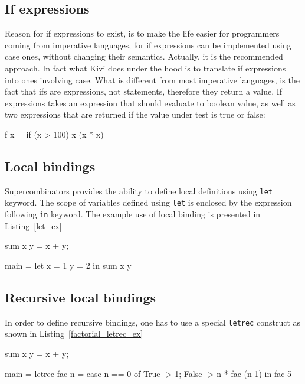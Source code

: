 \documentclass[12pt,a4paper]{report}
\begin{document}
\subsection{If expressions}
Reason for if expressions to exist, is to make the life easier for programmers
coming from imperative languages, for if expressions can be implemented using
case ones, without changing their semantics. Actually, it is the recommended
approach. In fact what Kivi does under the hood is to translate if expressions
into ones involving case.  What is different from most imperative languages, is
the fact that ifs are expressions, not statements, therefore they return a
value. If expressions takes an expression that should evaluate to boolean
value, as well as two expressions that are returned if the value under test is
true or false:

\vspace*{0.2in}
\begin{code}[style=haskell,label=lst:if_expression,caption={Fibonacci with case}]
  f x = if (x > 100) x (x * x)
\end{code}

\subsection{Local bindings}
Supercombinators provides the ability to define local definitions using
\texttt{let} keyword. The scope of variables defined using \texttt{let} is
enclosed by the expression following \texttt{in} keyword. The example use of
local binding is presented in Listing~\ref{let_ex}

\vspace*{0.2in}
\begin{code}[style=haskell,label=let_ex,caption={Local \texttt{let} binding.}]
  sum x y = x + y;

  main =
      let x = 1
          y = 2
      in
          sum x y
\end{code}

\subsection{Recursive local bindings}
In order to define recursive bindings, one has to use a special \texttt{letrec}
construct as shown in Listing~\ref{factorial_letrec_ex}

\vspace*{0.2in}
\begin{code}[style=haskell,label=factorial_letrec_ex,caption={Factorial function using \texttt{letrec}.}]
  sum x y = x + y;

  main =
      letrec fac n =
          case n == 0 of
              True  -> 1;
              False -> n * fac (n-1)
      in
          fac 5
\end{code}
\end{document}
